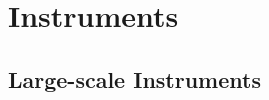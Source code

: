 \documentclass[\main/dresen_thesis.tex]{subfiles}
\renewcommand{\thisPath}{\main/chapters/largeScaleInstruments}
\begin{document}
\chapter{Instruments}
  \section{Large-scale Instruments}
    
      \FloatBarrier
    
      \FloatBarrier
    
      \FloatBarrier
    
      \FloatBarrier
    
      \FloatBarrier
    
      \FloatBarrier

  
    \FloatBarrier
\end{document}
